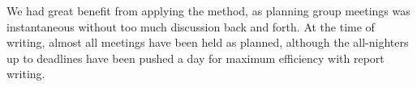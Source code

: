 We had great benefit from applying the method, as planning group meetings was instantaneous without too much discussion back and forth. At the time of writing, almost all meetings have been held as planned, although the all-nighters up to deadlines have been pushed a day for maximum efficiency with report writing.